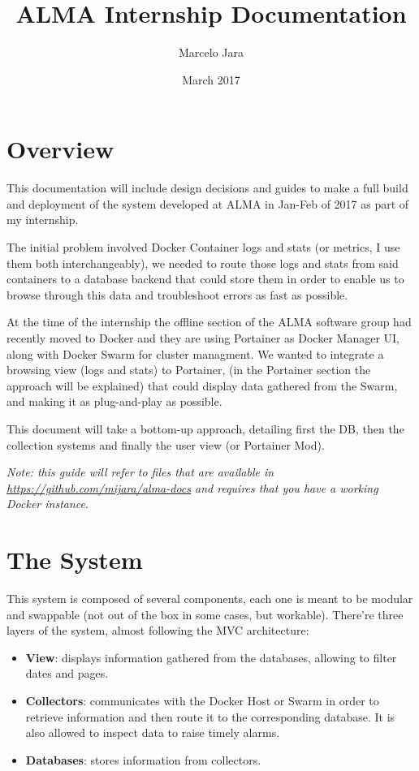 \documentclass{report}
\title{ALMA Internship Documentation}
\author{Marcelo Jara}
\date{March 2017}
\begin{document}
\maketitle

\chapter{Overview}

This documentation will include design decisions and 
guides to make a full build and deployment of the system
developed at ALMA in Jan-Feb of 2017 
as part of my internship.

The initial problem involved Docker Container logs and stats 
(or metrics, I use them both interchangeably), 
we needed to route those logs and stats
from said containers to a database backend 
that could store them in order to enable us to
browse through this data and troubleshoot errors as fast as possible.

At the time of the internship the offline section of the ALMA software group had recently moved to Docker and they are using Portainer as Docker Manager UI, along with Docker Swarm for cluster managment. We wanted to integrate a browsing view (logs and stats) to Portainer, (in the Portainer section the approach will be explained) that could display data gathered from the Swarm, and making it as plug-and-play as possible.

This document will take a bottom-up approach, 
detailing first the DB, then the collection systems and 
finally the user view (or Portainer Mod).

\textit{Note: this guide will refer to files that are available in \url{https://github.com/mijara/alma-docs} and requires that you have a working Docker instance}.

\tableofcontents

\chapter{The System}

This system is composed of several components, each one is meant to be modular and swappable (not out of the box in some cases, but workable). There're three layers of the system, almost following the MVC architecture:

\begin{itemize}
    \item 
        \textbf{View}: displays information gathered from the databases, allowing to filter dates and pages.
    \item 
        \textbf{Collectors}: communicates with the Docker Host or Swarm in order to retrieve information and then route it to the corresponding database. It is also allowed to inspect data to raise timely alarms.
    \item 
        \textbf{Databases}: stores information from collectors.
\end{itemize}
\end{document}
